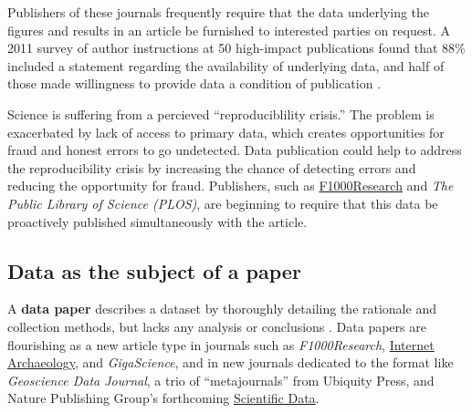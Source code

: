 \documentclass[10pt,a4paper,twocolumn]{article}
\begin{document}
Publishers of these journals frequently require that the data underlying the figures and results in an article be furnished to interested parties on request.
A 2011 survey of author instructions at 50 high-impact publications found that 88\% included a statement regarding the availability of underlying data, and half of those made willingness to provide data a condition of publication \cite{alsheikh_public_2011}.

Science is suffering from a percieved ``reproduciblility crisis.''\cite{mobley_a_2013,pashler_is_2012,zimmer_rise_2012,hiltzik_science_2013,begley_drug_2012,collins_nih_2014}
The problem is exacerbated by lack of access to primary data, which creates opportunities for fraud and honest errors to go undetected.
Data publication could help to address the reproducibility crisis by increasing the chance of detecting errors and reducing the opportunity for fraud.\cite{drew_lost_2013}
Publishers, such as \href{http://f1000research.com}{F1000Research} and \emph{The Public Library of Science (PLOS)}\cite{bloom_data_2014}, are beginning to require that this data be proactively published simultaneously with the article.



\subsection*{Data as the subject of a paper}\label{paper-subject-data}

A \textbf{data paper} describes a dataset by thoroughly detailing the rationale and collection methods, but lacks any analysis or conclusions \cite{newman_data_2009}. 
Data papers are flourishing as a new article type in journals such as \emph{F1000Research}, \href{http://www.internetarchaeology.org/}{Internet Archaeology}, and \emph{GigaScience}\cite{gigascience}, and in new journals dedicated to the format like \emph{Geoscience Data Journal}\cite{geoscience_data_journal}, a trio of ``metajournals'' from Ubiquity Press, and Nature Publishing Group's forthcoming \href{http://www.nature.com/scientificdata/}{Scientific Data}.
\end{document}
